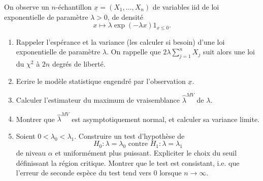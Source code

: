 On observe un $n$-échantillon $\underline x=(X_1,...,X_n)$ de variables iid de loi exponentielle de paramètre $\lambda>0$, de densité 
\[x\mapsto \lambda \exp(-\lambda x)1_{x\leq 0}.\]
\begin{enumerate}
\item Rappeler l'espérance et la variance (les calculer si besoin) d'une loi exponentielle de paramètre $\lambda$. On rappelle que $2\lambda \sum_{j=1}^n X_j$ suit alors une loi du $\chi^2$ à $2n$ degrés de liberté.
\item Ecrire le modèle statistique engendré par l'observation $ \underline x$.
\item Calculer l'estimateur du maximum de vraisemblance $\hat \lambda^{MV}$ de $\lambda$.
\item Montrer que $\hat \lambda^{MV}$ est asymptotiquement normal, et calculer sa variance limite.
\item Soient $0<\lambda_0 < \lambda_1$. Construire un test d'hypothèse de 
\[H_0 : \lambda =\lambda_0 \text{ contre } H_1 : \lambda = \lambda_1\]
de niveau $\alpha$ et uniformément plus puissant. Expliciter le choix du seuil définissant la région critique. Montrer que le test est consistant, i.e. que l'erreur de seconde espèce du test tend vers $0$ lorsque $n\rightarrow \infty$.
\end{enumerate}
